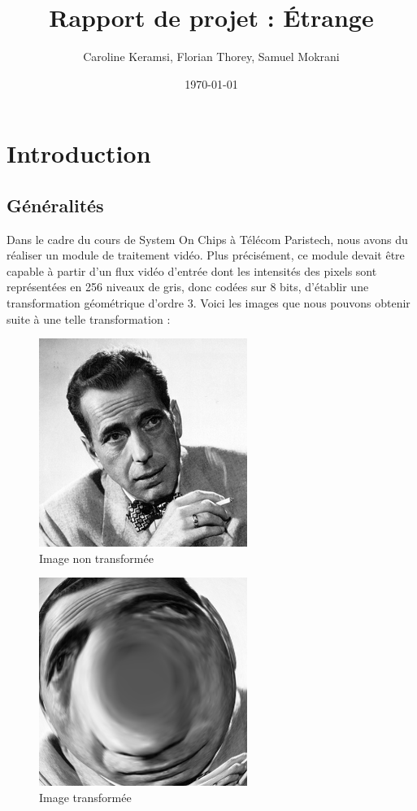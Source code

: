 \documentclass[a4paper,12pt]{report}
\title{Rapport de projet : Étrange}
\author {Caroline Keramsi, Florian Thorey, Samuel Mokrani}
\date{\today}
\begin{document}
\maketitle
\tableofcontents    %
\listoffigures        %

\chapter{Introduction}

\section{Généralités}

{Dans le cadre du cours de System On Chips à Télécom Paristech, nous avons du réaliser
  un module de traitement vidéo. Plus précisément, ce module devait être capable à partir d'un flux vidéo d'entrée dont les intensités des pixels sont représentées en 256 niveaux de gris, donc codées sur 8 bits, d'établir une transformation géométrique d'ordre 3. Voici les images que nous pouvons obtenir suite à une telle transformation :}

  \begin{figure}[!h]
  \centering
  \includegraphics[scale = 0.5]{bogart.png}
  \caption{Image non transformée}
  \end{figure}

  \begin{figure}[!h]
  \centering
  \includegraphics[scale = 0.5]{bogart_tr.png}
  \caption{Image transformée}
  \end{figure}
\end{document}
